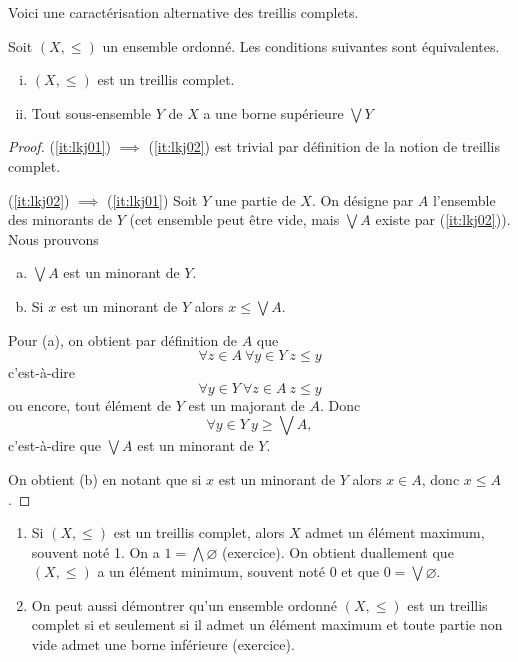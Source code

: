 \documentclass[french,course,oneside,theoremnosection]{lecture}
\begin{document}
 Voici une caractérisation alternative des treillis complets.
 
 \begin{proposition} Soit $(X, \leq)$ un ensemble ordonné. Les conditions suivantes sont équivalentes.
 \begin{enumerate}[(i)]
\item\label{it:lkj01} $(X, \leq)$ est un treillis complet.
\item\label{it:lkj02} Tout sous-ensemble $Y$ de $X$ a une borne supérieure ${\bigvee} Y$
\end{enumerate}
 \end{proposition}
 \begin{proof}

(\ref{it:lkj01}) $\implies$ (\ref{it:lkj02}) est trivial par définition de la notion de treillis complet.

(\ref{it:lkj02}) $\implies$ (\ref{it:lkj01}) Soit $Y$ une partie de $X$. On désigne par $A$ l'ensemble des minorants de $Y$ (cet ensemble peut être vide, mais ${\bigvee}A$ existe par (\ref{it:lkj02})). Nous prouvons
\begin{enumerate}[(a)]
\item ${\bigvee} A$ est un minorant de $Y$.
\item Si $x$ est un minorant de $Y$ alors $x \leq \bigvee A$.
\end{enumerate}

Pour (a), on obtient par définition de $A$ que
\[
\forall z \in A\ \forall y \in Y\  z \leq y
\] 
c'est-à-dire
\[
\forall y  \in Y\  \forall z \in A \  z\leq y
\]
ou encore, tout élément de $Y$ est un majorant de $A$. Donc
\[
\forall y \in Y \ y \geq {\textstyle \bigvee} A,
\]
c'est-à-dire que ${\bigvee} A$ est un minorant de $Y$.

On obtient (b) en notant que si $x$ est un minorant de $Y$ alors $x\in A$, donc $x\leq A$.
 \end{proof}
 
\begin{remark}
\begin{enumerate}
\item Si $(X, \leq)$ est un treillis complet, alors $X$ admet un élément maximum, souvent noté 1. On a $1=	{\bigwedge} \varnothing$ (exercice). On obtient duallement que $(X, \leq)$ a un élément minimum, souvent noté $0$ et que $0= {\bigvee \varnothing}$.

\item On peut aussi démontrer qu'un ensemble ordonné $(X, \leq)$ est un treillis complet si et seulement si il admet un élément maximum et toute partie non vide admet une borne inférieure (exercice).
\end{enumerate}
\end{remark}
\end{document}
